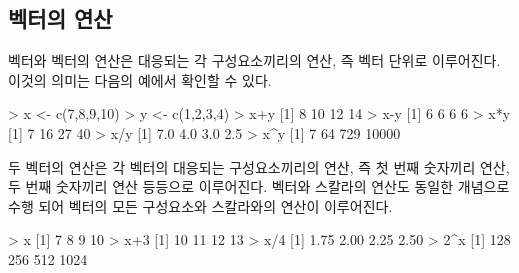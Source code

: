 \documentclass[
]{book}
\newenvironment{Shaded}{\begin{snugshade}}{\end{snugshade}}
\newcommand{\DecValTok}[1]{\textcolor[rgb]{0.00,0.00,0.81}{#1}}
\newcommand{\FloatTok}[1]{\textcolor[rgb]{0.00,0.00,0.81}{#1}}
\newcommand{\FunctionTok}[1]{\textcolor[rgb]{0.00,0.00,0.00}{#1}}
\newcommand{\NormalTok}[1]{#1}
\newcommand{\OtherTok}[1]{\textcolor[rgb]{0.56,0.35,0.01}{#1}}
\newcommand{\SpecialCharTok}[1]{\textcolor[rgb]{0.00,0.00,0.00}{#1}}
\begin{document}
\hypertarget{uxbca1uxd130uxc758-uxc5f0uxc0b0}{%
\subsection{벡터의 연산}\label{uxbca1uxd130uxc758-uxc5f0uxc0b0}}

벡터와 벡터의 연산은 대응되는 각 구성요소끼리의 연산, 즉 벡터 단위로 이루어진다.
이것의 의미는 다음의 예에서 확인할 수 있다.

\begin{Shaded}
\begin{Highlighting}[]
\SpecialCharTok{\textgreater{}}\NormalTok{ x }\OtherTok{\textless{}{-}} \FunctionTok{c}\NormalTok{(}\DecValTok{7}\NormalTok{,}\DecValTok{8}\NormalTok{,}\DecValTok{9}\NormalTok{,}\DecValTok{10}\NormalTok{)}
\SpecialCharTok{\textgreater{}}\NormalTok{ y }\OtherTok{\textless{}{-}} \FunctionTok{c}\NormalTok{(}\DecValTok{1}\NormalTok{,}\DecValTok{2}\NormalTok{,}\DecValTok{3}\NormalTok{,}\DecValTok{4}\NormalTok{)}
\SpecialCharTok{\textgreater{}}\NormalTok{ x}\SpecialCharTok{+}\NormalTok{y}
\NormalTok{[}\DecValTok{1}\NormalTok{]  }\DecValTok{8} \DecValTok{10} \DecValTok{12} \DecValTok{14}
\SpecialCharTok{\textgreater{}}\NormalTok{ x}\SpecialCharTok{{-}}\NormalTok{y}
\NormalTok{[}\DecValTok{1}\NormalTok{] }\DecValTok{6} \DecValTok{6} \DecValTok{6} \DecValTok{6}
\SpecialCharTok{\textgreater{}}\NormalTok{ x}\SpecialCharTok{*}\NormalTok{y}
\NormalTok{[}\DecValTok{1}\NormalTok{]  }\DecValTok{7} \DecValTok{16} \DecValTok{27} \DecValTok{40}
\SpecialCharTok{\textgreater{}}\NormalTok{ x}\SpecialCharTok{/}\NormalTok{y}
\NormalTok{[}\DecValTok{1}\NormalTok{] }\FloatTok{7.0} \FloatTok{4.0} \FloatTok{3.0} \FloatTok{2.5}
\SpecialCharTok{\textgreater{}}\NormalTok{ x}\SpecialCharTok{\^{}}\NormalTok{y}
\NormalTok{[}\DecValTok{1}\NormalTok{]     }\DecValTok{7}    \DecValTok{64}   \DecValTok{729} \DecValTok{10000}
\end{Highlighting}
\end{Shaded}

두 벡터의 연산은 각 벡터의 대응되는 구성요소끼리의 연산, 즉 첫 번째 숫자끼리 연산, 두
번째 숫자끼리 연산 등등으로 이루어진다. 벡터와 스칼라의 연산도 동일한 개념으로 수행
되어 벡터의 모든 구성요소와 스칼라와의 연산이 이루어진다.

\begin{Shaded}
\begin{Highlighting}[]
\SpecialCharTok{\textgreater{}}\NormalTok{ x}
\NormalTok{[}\DecValTok{1}\NormalTok{]  }\DecValTok{7}  \DecValTok{8}  \DecValTok{9} \DecValTok{10}
\SpecialCharTok{\textgreater{}}\NormalTok{ x}\SpecialCharTok{+}\DecValTok{3}
\NormalTok{[}\DecValTok{1}\NormalTok{] }\DecValTok{10} \DecValTok{11} \DecValTok{12} \DecValTok{13}
\SpecialCharTok{\textgreater{}}\NormalTok{ x}\SpecialCharTok{/}\DecValTok{4}
\NormalTok{[}\DecValTok{1}\NormalTok{] }\FloatTok{1.75} \FloatTok{2.00} \FloatTok{2.25} \FloatTok{2.50}
\SpecialCharTok{\textgreater{}} \DecValTok{2}\SpecialCharTok{\^{}}\NormalTok{x}
\NormalTok{[}\DecValTok{1}\NormalTok{]  }\DecValTok{128}  \DecValTok{256}  \DecValTok{512} \DecValTok{1024}
\end{Highlighting}
\end{Shaded}
\end{document}
